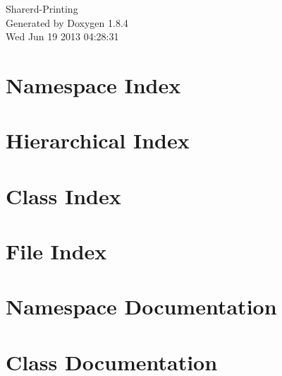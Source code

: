 \documentclass[twoside]{book}
\newcommand{\clearemptydoublepage}{%
  \newpage{\pagestyle{empty}\cleardoublepage}%
}
\begin{document}
\begin{titlepage}
\vspace*{7cm}
\begin{center}%
{\Large Sharerd-\/\-Printing }\\
\vspace*{1cm}
{\large Generated by Doxygen 1.8.4}\\
\vspace*{0.5cm}
{\small Wed Jun 19 2013 04:28:31}\\
\end{center}
\end{titlepage}
\clearemptydoublepage
\tableofcontents
\clearemptydoublepage
{}

\chapter{Namespace Index}

\chapter{Hierarchical Index}

\chapter{Class Index}

\chapter{File Index}

\chapter{Namespace Documentation}




\chapter{Class Documentation}















\end{document}
